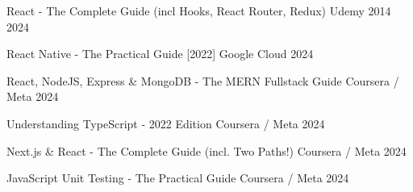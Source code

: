
\begin{cvhonors}

  \cvhonor
    {React - The Complete Guide (incl Hooks, React Router, Redux)} %
    {Udemy} %
    {2014} %
    {2024} %

  \cvhonor
    {React Native - The Practical Guide [2022]} %
    {Google Cloud} %
    {2024} %
    {} %

  \cvhonor
    {React, NodeJS, Express \& MongoDB - The MERN Fullstack Guide} %
    {Coursera / Meta} %
    {2024} %
    {} %

  \cvhonor
    {Understanding TypeScript - 2022 Edition} %
    {Coursera / Meta} %
    {2024} %
    {} %
    
  \cvhonor
    {Next.js \& React - The Complete Guide (incl. Two Paths!)} %
    {Coursera / Meta} %
    {2024} %
    {} %

  \cvhonor
    {JavaScript Unit Testing - The Practical Guide} %
    {Coursera / Meta} %
    {2024} %
    {} %

\end{cvhonors}
